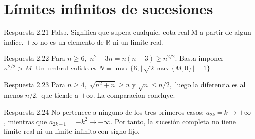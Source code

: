\documentclass[10pt,a4paper,oneside,openany]{book}
\begin{document}
\section{Límites infinitos de sucesiones}
\begin{PSevenAnswerFixed}{Respuesta 2.21}
Falso. Significa que supera cualquier cota real M a partir de algun indice. \(+\infty \) no es un elemento de \(\mathbb{R}\) ni un limite real.
\end{PSevenAnswerFixed}
\begin{PSevenAnswerFixed}{Respuesta 2.22}
Para \(n\ge 6,\) \(n^{2}-3n=n(n-3)\ge n^{2/2}\). Basta imponer \(n^{2/2}>M\). Un umbral valido es \(N=\max\{6,\lfloor \sqrt{2\,\max\{M,0\}}\rfloor +1\}\).
\end{PSevenAnswerFixed}
\begin{PSevenAnswerFixed}{Respuesta 2.23}
Para \(n\ge 4,\) \(\sqrt{n^{2}+n}\ge n\) y \(\sqrt{n}\le n/2,\) luego la diferencia es al menos \(n/2,\) que tiende a \(+\infty \). La comparacion concluye.
\end{PSevenAnswerFixed}
\begin{PSevenAnswerFixed}{Respuesta 2.24}
No pertenece a ninguno de los tres primeros casos: \(a_{2k}=k\to+\infty\), mientras que \(a_{2k-1}=-k^2\to-\infty\). Por tanto, la sucesión completa no tiene límite real ni un límite infinito con signo fijo.
\end{PSevenAnswerFixed}
\end{document}
